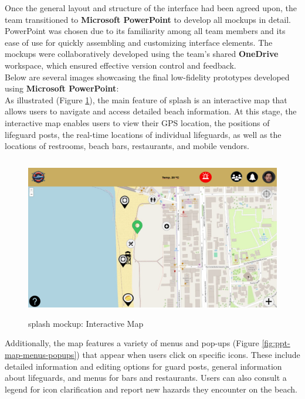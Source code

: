Once the general layout and structure of the interface had been agreed upon, the team transitioned to \textbf{Microsoft PowerPoint} to develop all mockups in detail. PowerPoint was chosen due to its familiarity among all team members and its ease of use for quickly assembling and customizing interface elements. The mockups were collaboratively developed using the team’s shared \textbf{OneDrive} workspace, which ensured effective version control and feedback. \\
Below are several images showcasing the final low-fidelity prototypes developed using \textbf{Microsoft PowerPoint}:\\

As illustrated (Figure \ref{fig:interactive-map}), the main feature of \ac{splash} is an interactive map that allows users to navigate and access detailed beach information. At this stage, the interactive map enables users to view their GPS location, the positions of lifeguard posts, the real-time locations of individual lifeguards, as well as the locations of restrooms, beach bars, restaurants, and mobile vendors.

\begin{figure}[H]
    \centering
    \includegraphics[width=13cm,height=7cm]{figs/Mockups/ppt-mockups-maps.png}
    \caption{\ac{splash} mockup: Interactive Map}
    \label{fig:interactive-map}
\end{figure}

Additionally, the map features a variety of menus and pop-ups (Figure \ref{fig:ppt-map-menus-popups}) that appear when users click on specific icons. These include detailed information and editing options for guard posts, general information about lifeguards, and menus for bars and restaurants. Users can also consult a legend for icon clarification and report new hazards they encounter on the beach.

